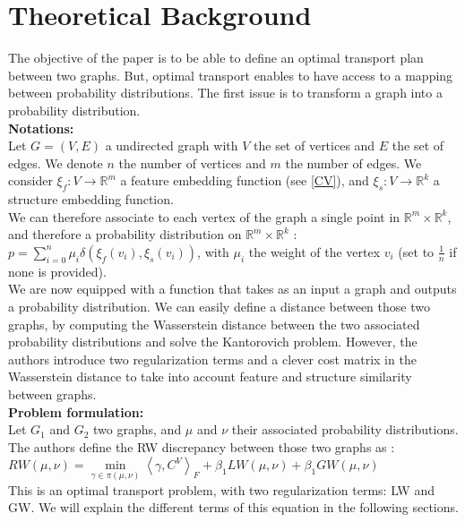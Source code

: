 \documentclass[a4paper,11pt]{article}
\begin{document}
\section{Theoretical Background}

The objective of the paper is to be able to define an optimal transport plan between two graphs. 
But, optimal transport enables to have access to a mapping between probability distributions. 
The first issue is to transform a graph into a probability distribution.\\[0.5cm]
\textbf{Notations:} \\[0.3cm]
Let $G=(V, E)$ a undirected graph with $V$ the set of vertices and $E$ the set of edges.
We denote $n$ the number of vertices and $m$ the number of edges.
We consider $\xi_f : V \rightarrow \mathbb{R}^m$ a feature embedding function (see \ref{CV}), and $\xi_s : V \rightarrow \mathbb{R}^k$ a structure embedding function.\\
We can therefore associate to each vertex of the graph a single point in $\mathbb{R}^m \times \mathbb{R}^k$, and therefore a probability distribution on $\mathbb{R}^m \times \mathbb{R}^k$ : $p = \sum_{i=0}^{n} \mu_i \delta(\xi_f(v_i), \xi_s(v_i))$, with $\mu_i$ the weight of the vertex $v_i$ (set to $\frac{1}{n}$ if none is provided).\\


We are now equipped with a function that takes as an input a graph and outputs a probability distribution.
We can easily define a distance between those two graphs, by computing the Wasserstein distance between the two associated probability distributions and solve the Kantorovich problem. 
However, the authors introduce two regularization terms and a clever cost matrix in the Wasserstein distance to take into account feature and structure similarity between graphs. \\[0.5cm]

\textbf{Problem formulation:} \\[0.3cm]
Let $G_1$ and $G_2$ two graphs, and $\mu$ and $\nu$ their associated probability distributions.
The authors define the RW discrepancy between those two graphs as : \\

$RW(\mu, \nu) = \underset{\gamma \in \pi(\mu, \nu)}{\operatorname{min}} {\left\langle \gamma , C^V \right\rangle}_F   + \beta_1 LW(\mu, \nu)  +\beta_1 GW(\mu, \nu) $\\

This is an optimal transport problem, with two regularization terms: LW and GW. 
We will explain the different terms of this equation in the following sections.
\end{document}

